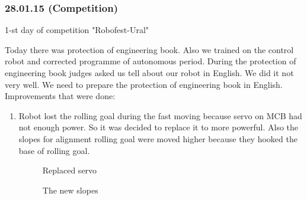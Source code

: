 \subsubsection{28.01.15 (Competition)}
\begin{center}
	1-st day of competition "Robofest-Ural"
\end{center}
Today there was protection of engineering book. Also we trained on the control robot and corrected programme of autonomous period. During the protection of engineering book judges asked us tell about our robot in English. We did it not very well. We need to prepare the protection of engineering book in English. \newline
Improvements that were done:
\begin{enumerate}
	\item Robot lost the rolling goal during the fast moving because servo on MCB had not enough power. So it was decided to replace it to more powerful. Also the slopes for alignment rolling goal were moved higher because they hooked the base of rolling goal. 
	\begin{figure}[H]
		\begin{minipage}[h]{0.47\linewidth}
			\caption{Replaced servo}
		\end{minipage}
		\hfill
	    \begin{minipage}[h]{0.47\linewidth}
	    	\caption{The new slopes}
	    \end{minipage}
	\end{figure}
	

\end{enumerate}
